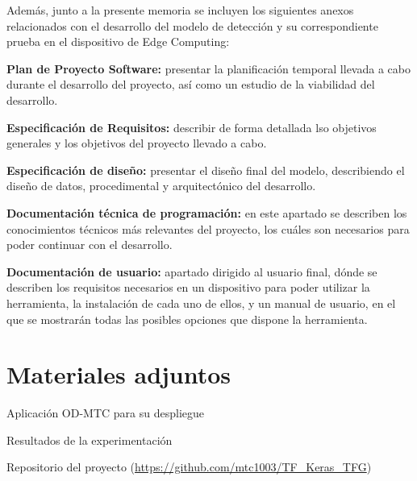 Además, junto a la presente memoria se incluyen los siguientes anexos relacionados con el desarrollo del modelo de detección y su correspondiente prueba en el dispositivo de Edge Computing:
\begin{list}{\textbullet}{ %
    \addtolength{\itemsep}{-2mm} %
    \setlength{\itemindent}{2mm}}

    \item \textbf{Plan de Proyecto Software:} presentar la planificación temporal llevada a cabo durante el desarrollo del proyecto, así como un estudio de la viabilidad del desarrollo.
    \item \textbf{Especificación de Requisitos:} describir de forma detallada lso objetivos generales y los objetivos del proyecto llevado a cabo.
    \item \textbf{Especificación de diseño:} presentar el diseño final del modelo, describiendo el diseño de datos, procedimental y arquitectónico del desarrollo.
    \item \textbf{Documentación técnica de programación:} en este apartado se describen los conocimientos técnicos más relevantes del proyecto, los cuáles son necesarios para poder continuar con el desarrollo.
    \item \textbf{Documentación de usuario:} apartado dirigido al usuario final, dónde se describen los requisitos necesarios en un dispositivo para poder utilizar la herramienta, la instalación de cada uno de ellos, y un manual de usuario, en el que se mostrarán todas las posibles opciones que dispone la herramienta.
\end{list}

\section{Materiales adjuntos}
\begin{list}{\textbullet}{ %
    \addtolength{\itemsep}{-2mm} %
    \setlength{\itemindent}{2mm}}

    \item Aplicación OD-MTC para su despliegue
    \item Resultados de la experimentación
    \item Repositorio del proyecto (\url{https://github.com/mtc1003/TF_Keras_TFG})
\end{list}